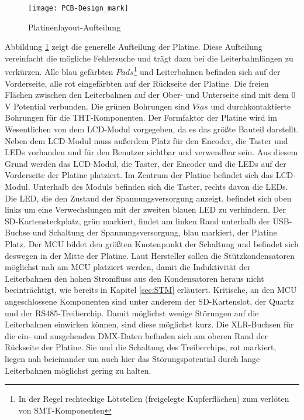 \begin{figure}[h]
	\begin{center}
		\texttt{[image: PCB-Design\_mark]}
		\caption{Platinenlayout-Aufteilung}
		\label{fig:PCB-Layout}
	\end{center}
\end{figure}
Abbildung \ref{fig:PCB-Layout} zeigt die generelle Aufteilung der Platine. Diese Aufteilung vereinfacht die mögliche Fehlersuche und trägt dazu bei die Leiterbahnlängen zu verkürzen. Alle blau gefärbten $Pads$\footnote{In der Regel rechteckige Lötstellen (freigelegte Kupferflächen) zum verlöten von SMT-Komponenten} und Leiterbahnen befinden sich auf der Vorderseite, alle rot eingefärbten auf der Rückseite der Platine. Die freien Flächen zwischen den Leiterbahnen auf der Ober- und Unterseite sind mit dem 0\,V Potential verbunden. Die grünen Bohrungen sind $Vias$ und durchkontaktierte Bohrungen für die THT-Komponenten.
Der Formfaktor der Platine wird im Wesentlichen von dem LCD-Modul vorgegeben, da es das größte Bauteil darstellt. Neben dem LCD-Modul muss außerdem Platz für den Encoder, die Taster und LEDs vorhanden und für den Benutzer sichtbar und verwendbar sein. Aus diesem Grund werden das LCD-Modul, die Taster, der Encoder und die LEDs auf der Vorderseite der Platine platziert. Im Zentrum der Platine befindet sich das LCD-Modul. Unterhalb des Moduls befinden sich die Taster, rechts davon die LEDs. Die LED, die den Zustand der Spannungsversorgung anzeigt, befindet sich oben links um eine Verwechslungen mit der zweiten blauen LED zu verhindern. Der SD-Kartensteckplatz, grün markiert, findet am linken Rand unterhalb der USB-Buchse und Schaltung der Spannungsversorgung, blau markiert, der Platine Platz. Der MCU bildet den größten Knotenpunkt der Schaltung und befindet sich deswegen in der Mitte der Platine. Laut Hersteller sollen die Stützkondensatoren möglichst nah am MCU platziert werden, damit die Induktivität der Leiterbahnen den hohen Stromfluss aus den Kondensatoren heraus nicht beeinträchtigt, wie bereits in Kapitel \ref{sec:STM} erläutert. Kritische, an den MCU angeschlossene Komponenten sind unter anderem der SD-Kartenslot, der Quartz und der RS485-Treiberchip. Damit möglichst wenige Störungen auf die Leiterbahnen einwirken können, sind diese möglichst kurz. Die XLR-Buchsen für die ein- und ausgehenden DMX-Daten befinden sich am oberen Rand der Rückseite der Platine. Sie und die Schaltung des Treiberchips, rot markiert, liegen nah beieinander um auch hier das Störungspotential durch lange Leiterbahnen möglichst gering zu halten.